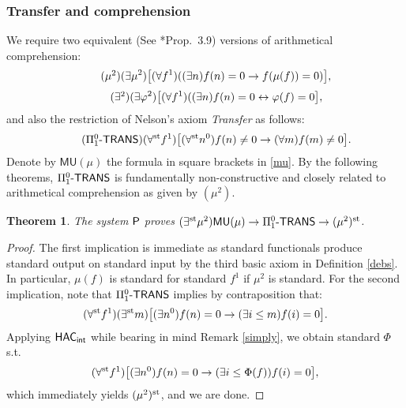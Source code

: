 \documentclass[reqno]{amsart}
\newtheorem{thm}{Theorem}
\newcommand\be{\begin{equation}}
\newcommand\ee{\end{equation}}
\def\P{\textup{\textsf{P}}}
\def\st{\textup{st}}
\def\asa{\leftrightarrow}
\def\di{\rightarrow}
\def\paai{\Pi_{1}^{0}\textup{-\textsf{TRANS}}}
\def\MU{\textup{\textsf{MU}}}
\def\HAC{\textup{\textsf{HAC}}}
\def\INT{\textup{\textsf{int}}}
\numberwithin{equation}{section}
\numberwithin{thm}{section}
\begin{document}
\subsubsection{Transfer and comprehension}
We require two equivalent (See \cite{kohlenbach2}*{Prop.\ 3.9}) versions of arithmetical comprehension: %
\be\label{mu}\tag{$\mu^{2}$}
(\exists \mu^{2})\big[(\forall f^{1})( (\exists n)f(n)=0 \di f(\mu(f))=0)    \big],
\ee
\be\label{mukio}\tag{$\exists^{2}$}
(\exists \varphi^{2})\big[(\forall f^{1})( (\exists n)f(n)=0 \asa \varphi(f)=0    \big],
\ee
and also the restriction of Nelson's axiom \emph{Transfer} as follows:
\be\tag{$\paai$}
(\forall^{\st}f^{1})\big[(\forall^{\st}n^{0})f(n)\ne0\di (\forall m)f(m)\ne0\big].
\ee
Denote by $\textsf{MU}(\mu)$ the formula in square brackets in \eqref{mu}.  By the following theorems, $\paai$ is fundamentally non-constructive and closely related to arithmetical comprehension as given by $(\mu^{2})$.  
\begin{thm}\label{klabaka}
The system $\P$ proves $(\exists^{\st}\mu^{2})\MU(\mu)\di \paai \di (\mu^{2})^{\st}$.  
\end{thm}
\begin{proof}
The first implication is immediate as standard functionals produce standard output on standard input by the third basic axiom in Definition \ref{debs}.  In particular, $\mu(f)$ is standard for standard $f^{1}$ if $\mu^{2}$ is standard.  For the second implication, note that $\paai$ implies by contraposition that:
\be\label{toggg}
(\forall^{\st}f^{1})(\exists^{\st}m)\big[(\exists n^{0})f(n)=0\di (\exists i\leq m)f(i)=0\big].
\ee
Applying $\HAC_{\INT}$ while bearing in mind Remark \ref{simply}, we obtain standard $\Phi$ s.t.\ 
\be\label{geluklkt}
(\forall^{\st}f^{1})\big[(\exists n^{0})f(n)=0\di (\exists i\leq \Phi(f))f(i)=0\big], 
\ee
which immediately yields $(\mu^{2})^{\st}$, and we are done. 
\end{proof}
\end{document}
